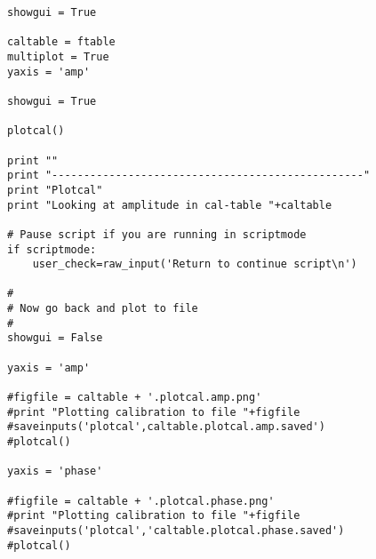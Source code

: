 \begin{verbatim}
showgui = True
    
caltable = ftable
multiplot = True
yaxis = 'amp'

showgui = True
    
plotcal()

print ""
print "-------------------------------------------------"
print "Plotcal"
print "Looking at amplitude in cal-table "+caltable

# Pause script if you are running in scriptmode
if scriptmode:
    user_check=raw_input('Return to continue script\n')

#
# Now go back and plot to file
#
showgui = False

yaxis = 'amp'

#figfile = caltable + '.plotcal.amp.png'
#print "Plotting calibration to file "+figfile
#saveinputs('plotcal',caltable.plotcal.amp.saved')
#plotcal()

yaxis = 'phase'

#figfile = caltable + '.plotcal.phase.png'
#print "Plotting calibration to file "+figfile
#saveinputs('plotcal','caltable.plotcal.phase.saved')
#plotcal()

\end{verbatim}
